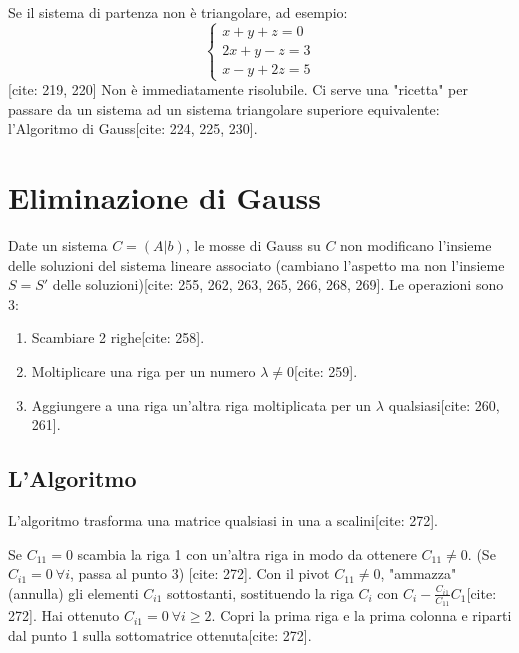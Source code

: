 \documentclass[11pt,a4paper]{article}
\begin{document}
Se il sistema di partenza non è triangolare, ad esempio:
$$
\begin{cases} x + y + z = 0 \\ 2x + y - z = 3 \\ x - y + 2z = 5 \end{cases}
$$
[cite: 219, 220]
Non è immediatamente risolubile. Ci serve una "ricetta" per passare da un sistema ad un sistema triangolare superiore equivalente: l'Algoritmo di Gauss[cite: 224, 225, 230].

\section{Eliminazione di Gauss}

\begin{definition}
Date un sistema $C = (A|b)$, le mosse di Gauss su $C$ non modificano l'insieme delle soluzioni del sistema lineare associato (cambiano l'aspetto ma non l'insieme $S = S'$ delle soluzioni)[cite: 255, 262, 263, 265, 266, 268, 269]. Le operazioni sono 3:
\begin{enumerate}
    \item Scambiare 2 righe[cite: 258].
    \item Moltiplicare una riga per un numero $\lambda \neq 0$[cite: 259].
    \item Aggiungere a una riga un'altra riga moltiplicata per un $\lambda$ qualsiasi[cite: 260, 261].
\end{enumerate}
\end{definition}

\subsection{L'Algoritmo}
L'algoritmo trasforma una matrice qualsiasi in una a scalini[cite: 272].
\begin{algorithmic}[1]
\STATE Se $C_{11} = 0$ scambia la riga 1 con un'altra riga in modo da ottenere $C_{11} \neq 0$. (Se $C_{i1} = 0 \ \forall i$, passa al punto 3) [cite: 272].
\STATE Con il pivot $C_{11} \neq 0$, "ammazza" (annulla) gli elementi $C_{i1}$ sottostanti, sostituendo la riga $C_i$ con $C_i - \frac{C_{i1}}{C_{11}} C_1$[cite: 272].
\STATE Hai ottenuto $C_{i1} = 0 \ \forall i \ge 2$. Copri la prima riga e la prima colonna e riparti dal punto 1 sulla sottomatrice ottenuta[cite: 272].
\end{algorithmic}
\end{document}
